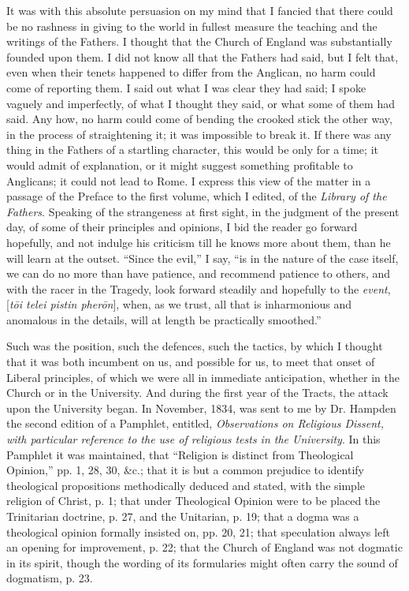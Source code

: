 It was with this absolute
persuasion on my mind that I fancied that
there could be no rashness in giving to the world in fullest
measure the teaching and the writings of the Fathers. I thought that the
Church of England was substantially founded upon them. I did not know
all that the Fathers had said, but I felt that, even when their tenets
happened to differ from the Anglican, no harm could come of reporting
them. I said out what I was clear they had said; I spoke vaguely and
imperfectly, of what I thought they said, or what some of them had said.
Any how, no harm could come of bending the crooked stick the other way,
in the process of straightening it; it was impossible to break it. If
there was any thing in the Fathers of a startling character, this would be only for a time; it would admit of explanation, or it
might suggest something profitable to Anglicans; it could not lead
to Rome. I express this view of the matter in a passage of the Preface
to the first volume, which I edited, of the \emph{Library of the Fathers}.
Speaking of the strangeness at first sight, in the
judgment of the present day, of some of their principles and opinions, I bid the
reader go forward hopefully, and not indulge his criticism till he knows
more about them, than he will learn at the outset. ``Since the
evil,'' I say, ``is in the nature of the case itself, we can do
no more than have patience, and recommend patience to others, and with
the racer in the Tragedy, look forward steadily and hopefully to the \emph{event},
[\emph{t\={o}i telei pistin pher\={o}n}], when, as we trust, all that is inharmonious and anomalous in
the details, will at length be practically smoothed.''

Such was the position, such the defences, such the tactics, by which
I thought that it was both incumbent on us, and possible for us, to meet that onset of Liberal principles, of which we were all in
immediate anticipation, whether in the Church or in the University. And
during the first year of the Tracts, the attack upon the University
began. In November, 1834, was sent to me by Dr. Hampden the
second edition of a Pamphlet, entitled, \emph{Observations on Religious
Dissent, with particular reference to the use of religious tests in the
University}. In this Pamphlet it was maintained, that
``Religion is distinct from Theological Opinion,'' pp. 1, 28,
30, \&c.; that it is but a common prejudice to identify theological
propositions methodically deduced and stated, with the simple religion
of Christ, p. 1; that under Theological Opinion were to be placed the
Trinitarian doctrine, p. 27, and the Unitarian, p. 19; that a dogma was
a theological opinion formally insisted on, pp. 20, 21; that
speculation always left an opening for improvement, p. 22; that the
Church of England was not dogmatic in its spirit, though the wording of
its formularies might often carry the sound of dogmatism, p. 23.

